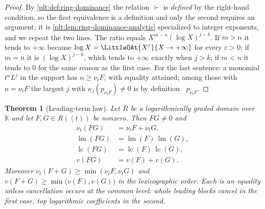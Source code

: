 \documentclass[11pt,oneside]{article}
\theoremstyle{plain}
\newtheorem{theorem}{Theorem}[section]
\theoremstyle{definition}
\theoremstyle{remark}
\newcommand{\K}{\mathbb{K}}
\newcommand{\ordt}{\nu_{t}}                              %
\DeclareMathOperator{\lm}{lm}
\DeclareMathOperator{\lc}{lc}
\DeclareMathOperator{\degL}{deg_{L}}
\newcommand{\succdom}{\succ}
\begin{document}
\begin{proof}
By \cref{plt:def:ring-dominance} the relation $\succdom$ is \emph{defined} by
the right-hand condition, so the first equivalence is a definition and only
the second requires an argument; it is
\cref{plt:lem:ring-dominance-analytic} specialized to integer exponents, and
we repeat the two lines.  The ratio equals $X^{m-n}(\log X)^{j-k}$.  If $m>n$
it tends to $+\infty$
because $\log X=\LittleOAt{X^{\varepsilon}}{X\to+\infty}$ for every
$\varepsilon>0$; if $m=n$ it is $(\log X)^{j-k}$, which tends to $+\infty$
exactly when $j>k$; if $m<n$ it tends to $0$ for the same reason as the first
case.  For the last sentence: a monomial $t^nL^j$ in the support has
$n\ge\ordt F$, with equality attained; among those with $n=\ordt F$ the
largest $j$ with $\kappa_j(p_{\ordt F})\ne0$ is by definition
$\degL p_{\ordt F}$.
\end{proof}

\begin{theorem}[Leading-term law]
\label{plt:thm:mul-leading-law}
Let $R$ be a logarithmically graded domain over $\K$ and let $F,G\in R((t))$
be nonzero.  Then $FG\ne0$ and
\begin{align}
 \ordt(FG)&=\ordt F+\ordt G,
 \label{plt:eq:mul-ord-additive}\\
 \lm(FG)&=\lm(F)\,\lm(G),
 \label{plt:eq:mul-lm-law}\\
 \lc(FG)&=\lc(F)\,\lc(G),
 \label{plt:eq:mul-lc-law}\\
 v(FG)&=v(F)+v(G).
 \label{plt:eq:mul-v-additive}
\end{align}
Moreover $\ordt(F+G)\ge\min(\ordt F,\ordt G)$ and
$v(F+G)\ge\min\bigl(v(F),v(G)\bigr)$ in the lexicographic order.  Each is an
equality unless cancellation occurs at the common level: whole leading blocks
cancel in the first case, top logarithmic coefficients in the second.
\end{theorem}
\end{document}
